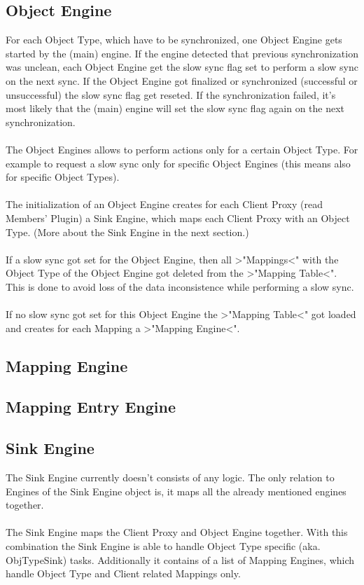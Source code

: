 \subsection{Object Engine}
For each Object Type, which have to be synchronized, one Object Engine gets 
started by the (main) engine. If the engine detected that previous 
synchronization was unclean, each Object Engine get the slow sync flag set to 
perform a slow sync on the next sync. If the Object Engine got finalized or 
synchronized (successful or unsuccessful) the slow sync flag get reseted. If 
the synchronization failed, it's most likely that the (main) engine will set 
the slow sync flag again on the next synchronization.\\
\\
The Object Engines allows to perform actions only for a certain Object Type. For
example to request a slow sync only for specific Object Engines (this means also
for specific Object Types).\\
\\
The initialization of an Object Engine creates for each Client Proxy (read 
Members' Plugin) a Sink Engine, which maps each Client Proxy with an Object
Type. (More about the Sink Engine in the next section.)\\
\\
If a slow sync got set for the Object Engine, then all >"Mappings<" with the
Object Type of the Object Engine got deleted from the >"Mapping Table<". This is
done to avoid loss of the data inconsistence while performing a slow sync.\\
\\
If no slow sync got set for this Object Engine the >"Mapping Table<" got loaded
and creates for each Mapping a >"Mapping Engine<".




\subsection{Mapping Engine}
\subsection{Mapping Entry Engine}


\subsection{Sink Engine}
The Sink Engine currently doesn't consists of any logic. The only relation to
Engines of the Sink Engine object is, it maps all the already mentioned engines
together.\\
\\
The Sink Engine maps the Client Proxy and Object Engine together. With this 
combination the Sink Engine is able to handle Object Type specific (aka. 
ObjTypeSink) tasks. Additionally it contains of a list of Mapping Engines, 
which handle Object Type and Client related Mappings only.

